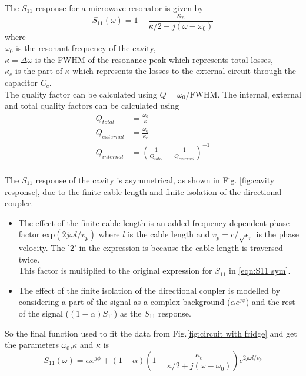 The $S_{11}$ response for a microwave resonator is given by \cite{Aspelmeyer2014}
\begin{equation}
S_{11}(\omega) = 1-\frac{\kappa_e}{\kappa/2+j(\omega-\omega_0)}
\end{equation}
where\\
$\omega_0$ is the resonant frequency of the cavity,\\
$\kappa = \Delta\omega$ is the FWHM of the resonance peak which represents total losses,\\
$\kappa_e$ is the part of $\kappa$ which represents the losses to the external circuit through the capacitor $C_c$.\\
The quality factor can be calculated using $Q = \omega_0/\text{FWHM}$. The internal, external and total quality factors can be calculated using
\begin{align}
Q_{total} &= \frac{\omega_0}{\kappa}\\
Q_{external} &= \frac{\omega_0}{\kappa_e}\\
Q_{internal} &= \left(\frac{1}{Q_{total}}-\frac{1}{Q_{external}}\right)^{-1}\\
\end{align}

The $S_{11}$ response of the cavity is asymmetrical, as shown in Fig. \ref{fig:cavity response}, due to the finite cable length and finite isolation of the directional coupler.
\begin{itemize}
\item The effect of the finite cable length is an added frequency dependent phase factor $\text{exp}(2j\omega l/v_p)$ where $l$ is the cable length and $v_p=c/\sqrt{\epsilon_r}$ is the phase velocity. The '$2$' in the expression is because the cable length is traversed twice.\\
This factor is multiplied to the original expression for $S_{11}$ in \ref{eqn:S11 sym}.
\item The effect of the finite isolation of the directional coupler is modelled by considering a part of the signal as a complex background ($\alpha e^{j\phi}$) and the rest of the signal ($(1-\alpha)S_{11}$) as the $S_{11}$ response.
\end{itemize}
So the final function used to fit the data from Fig.\ref{fig:circuit with fridge} and get the parameters $\omega_0$,$\kappa$ and $\kappa$ is
\begin{equation}
S_{11}(\omega) = \alpha e^{j\phi}+(1-\alpha)\left(1-\frac{\kappa_e}{\kappa/2+j(\omega-\omega_0)}\right)e^{2j\omega l/v_p}
\end{equation}

